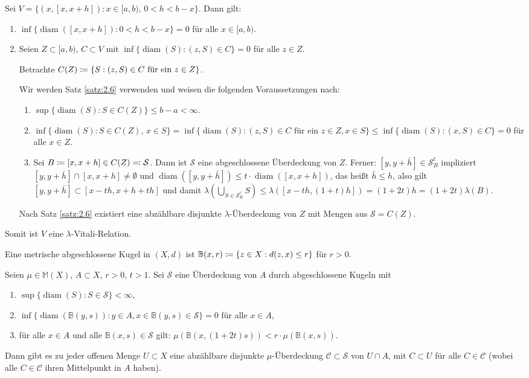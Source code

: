 \documentclass[a4paper,twoside,DIV15,BCOR12mm]{scrbook}
\DeclareMathOperator{\diam}{diam}
\begin{document}
\begin{beispiel}
Sei $V=\{(x,[x,x+h]): x\in [a,b),\, 0<h<b-x\}$. Dann gilt:
\begin{enumerate}
\item $\inf\{\diam([x,x+h]) : 0 < h < b-x\}=0$ für alle $x\in[a,b)$.
\item Seien $Z\subset [a,b)$, $C\subset V$ mit $\inf\{\diam(S): (z,S) \in C\}=0$ für alle $z\in Z$.

Betrachte $C(Z) \da \{S: (z,S)\in C\text{ für ein }z\in Z\}$.

Wir werden Satz \ref{satz:2.6} verwenden und weisen die folgenden Voraussetzungen nach:
\begin{enumerate}
\item $\sup\{\diam(S): S\in C(Z)\} \le b-a < \infty$.
\item $\inf\{\diam(S): S\in C(Z),\, x\in S\} = \inf\{\diam(S) : (z,S) \in C \text{ für ein $z\in Z$}, x\in S\} \le \inf\{\diam(S): (x,S)\in C\} = 0$ für alle $x\in Z$.
\item Sei $B \da [x,x+h] \in C(Z) \ad \mathcal S$. Dann ist $\mathcal S$ eine abgeschlossene Überdeckung von $Z$. Ferner: $[y,y+\bar h]\in\mathcal S_B^t$ impliziert $[y,y+\bar h] \cap [x,x+h] \ne \emptyset$ und $\diam([y,y+\bar h]) \le t\cdot \diam([x,x+h])$, das heißt $\bar h \le h$, also gilt $[y,y+\bar h] \subset [x-th,x+h+th]$ und damit $\lambda(\bigcup_{S\in\mathcal S_B^t}S) \le \lambda([x-th,(1+t)h]) = (1+2t)h = (1+2t)\lambda(B)$.
\end{enumerate}
Nach Satz \ref{satz:2.6} existiert eine abzählbare disjunkte $\lambda$-Überdeckung von $Z$ mit Mengen aus $\mathcal S = C(Z)$. 
\end{enumerate}
Somit ist $V$ eine $\lambda$-Vitali-Relation.
\end{beispiel}

\begin{definition}
Eine metrische abgeschlossene Kugel in $(X,d)$ ist $\mathbb B(x,r) \da  \{z\in X: d(z,x) \le r\}$ für $r>0$.
\end{definition}

\begin{korollar}
Seien $\mu \in \mathbb M(X)$, $A\subset X$, $r>0$, $t>1$. Sei $\mathcal S$ eine Überdeckung von $A$ durch abgeschlossene Kugeln mit
\begin{enumerate}
\item $\sup\{\diam(S): S\in\mathcal S\} <\infty$,
\item $\inf\{\diam(\mathbb B(y,s)): y\in A, x\in\mathbb B(y,s)\in \mathcal S\} = 0$ für alle $x\in A$,
\item für alle $x\in A$ und alle $\mathbb B(x,s)\in\mathcal S$ gilt: $\mu(\mathbb B(x,(1+2t)s)) < r \cdot \mu(\mathbb B(x,s))$.
\end{enumerate}
Dann gibt es zu jeder offenen Menge $U\subset X$ eine abzählbare disjunkte $\mu$-Überdeckung $\mathcal C\subset \mathcal S$ von $U\cap A$, mit $C\subset U$ für alle $C\in\mathcal C$ (wobei alle $C\in\mathcal C$ ihren Mittelpunkt in $A$ haben).
\end{korollar}
\end{document}
